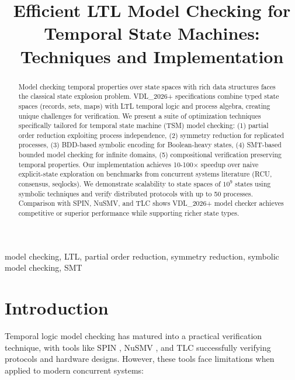 \documentclass[conference]{IEEEtran}
\begin{document}
\title{Efficient LTL Model Checking for Temporal State Machines: Techniques and Implementation}

\author{
}

\maketitle

\begin{abstract}
Model checking temporal properties over state spaces with rich data structures faces the classical state explosion problem. VDL\_2026+ specifications combine typed state spaces (records, sets, maps) with LTL temporal logic and process algebra, creating unique challenges for verification. We present a suite of optimization techniques specifically tailored for temporal state machine (TSM) model checking: (1) partial order reduction exploiting process independence, (2) symmetry reduction for replicated processes, (3) BDD-based symbolic encoding for Boolean-heavy states, (4) SMT-based bounded model checking for infinite domains, (5) compositional verification preserving temporal properties. Our implementation achieves 10-100× speedup over naive explicit-state exploration on benchmarks from concurrent systems literature (RCU, consensus, seqlocks). We demonstrate scalability to state spaces of $10^9$ states using symbolic techniques and verify distributed protocols with up to 50 processes. Comparison with SPIN, NuSMV, and TLC shows VDL\_2026+ model checker achieves competitive or superior performance while supporting richer state types.
\end{abstract}

\begin{IEEEkeywords}
model checking, LTL, partial order reduction, symmetry reduction, symbolic model checking, SMT
\end{IEEEkeywords}

\section{Introduction}

Temporal logic model checking \cite{clarke1999} has matured into a practical verification technique, with tools like SPIN \cite{holzmann1997}, NuSMV \cite{nusmv}, and TLC \cite{lamport2002} successfully verifying protocols and hardware designs. However, these tools face limitations when applied to modern concurrent systems:
\end{document}

